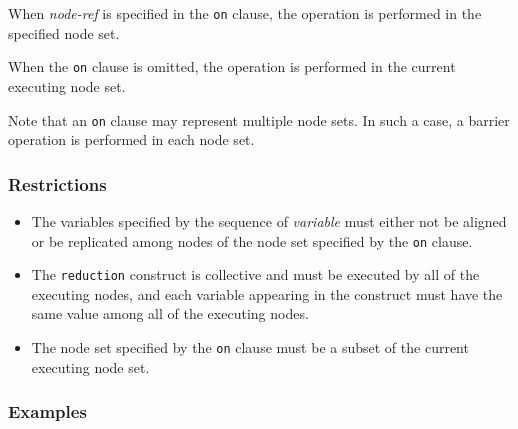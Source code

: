 When {\it node-ref} is specified in the {\tt on} clause, the operation
is performed in the specified node set.

When the {\tt on} clause is omitted, the operation is performed in the
current executing node set.

Note that an {\tt on} clause may represent multiple node sets. In such a
case, a barrier operation is performed in each node set.

\subsubsection*{Restrictions}

\begin{itemize}
 \item The variables specified by the sequence of {\it variable} must
       either not be aligned or be replicated among nodes of the node
       set specified by the {\tt on} clause.
 \item The {\tt reduction} construct is collective and must be
       executed by all of the executing nodes, and each variable
       appearing in the construct must have the same value among all of
       the executing nodes.
 \item The node set specified by the {\tt on} clause must be a subset of the
       current executing node set.
\end{itemize}

\subsubsection*{Examples}

